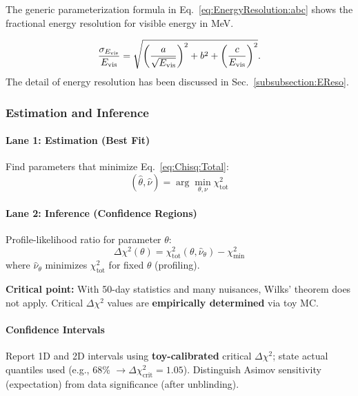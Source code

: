 The generic parameterization formula in Eq.~\eqref{eq:EnergyResolution:abc} shows the fractional energy resolution for visible energy in MeV.

\begin{equation}
    \frac{\sigma_{E_{\rm vis}}}{E_{\rm vis}}=\sqrt{\left(\frac{a}{\sqrt{E_{\rm vis}}}\right)^2+b^2+\left(\frac{c}{E_{\rm vis}}\right)^2}.
    \label{eq:EnergyResolution:abc}
\end{equation}
The detail of energy resolution has been discussed in Sec.~\ref{subsubsection:EReso}.

\subsubsection{Estimation and Inference}

\paragraph{Lane 1: Estimation (Best Fit)}
Find parameters that minimize Eq.~\eqref{eq:Chisq:Total}:
\begin{equation}
  (\hat\theta,\hat\nu) = \arg\min_{\theta,\nu} \chi^2_{\text{tot}} \label{eq:bestfit}
\end{equation}

\paragraph{Lane 2: Inference (Confidence Regions)}
Profile-likelihood ratio for parameter $\theta$:
\begin{equation}
  \Delta\chi^2(\theta) = \chi^2_{\text{tot}}(\theta,\hat\nu_\theta) - \chi^2_{\min} \label{eq:profile}
\end{equation}
where $\hat\nu_\theta$ minimizes $\chi^2_{\text{tot}}$ for fixed $\theta$ (profiling).

\textbf{Critical point:} With 50-day statistics and many nuisances, Wilks' theorem
does not apply. Critical $\Delta\chi^2$ values are \textbf{empirically determined}
via toy MC.

\paragraph{Confidence Intervals}
Report 1D and 2D intervals using \textbf{toy-calibrated} critical $\Delta\chi^2$;
state actual quantiles used (e.g., 68\% $\rightarrow \Delta\chi^2_{\text{crit}} = 1.05$).
Distinguish Asimov sensitivity (expectation) from data significance (after unblinding).

